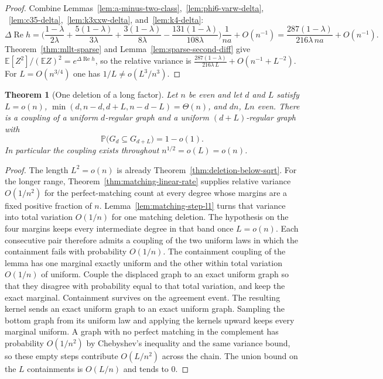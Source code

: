 \documentclass[11pt]{article}
\newtheorem{theorem}{Theorem}
\newcommand{\EE}{\mathbb{E}}
\newcommand{\PP}{\mathbb{P}}
\begin{document}
\begin{proof}
Combine Lemmas~\ref{lem:a-minus-two-class},~\ref{lem:phi6-varw-delta},
~\ref{lem:c35-delta},~\ref{lem:k3xxw-delta}, and~\ref{lem:k4-delta}:
\[
\Delta\operatorname{Re}h
=
\Biggl(
\frac{1-\lambda}{2\lambda}
+\frac{5(1-\lambda)}{3\lambda}
+\frac{3(1-\lambda)}{8\lambda}
-\frac{131(1-\lambda)}{108\lambda}
\Biggr)\frac1{na}+O(n^{-1})
=
\frac{287(1-\lambda)}{216\lambda\,na}+O(n^{-1}).
\]
Theorem~\ref{thm:mllt-sparse} and Lemma~\ref{lem:sparse-second-diff} give
\(\EE[Z^2]/(\EE Z)^2=e^{\Delta\operatorname{Re}h}\), so the relative variance is
\(\frac{287(1-\lambda)}{216\lambda\,L}+O(n^{-1}+L^{-2})\). For
\(L=O(n^{3/4})\) one has \(1/L\ne o(L^3/n^3)\).
\end{proof}

\begin{theorem}[One deletion of a long factor]
\label{thm:long-step}
\label{conj:long-step}
Let \(n\) be even and let \(d\) and \(L\) satisfy \(L=o(n)\),
\(\min(d,n-d,d+L,n-d-L)=\Theta(n)\), and \(dn\), \(Ln\) even.
There is a coupling of a uniform \(d\)-regular graph and a uniform
\((d+L)\)-regular graph with
\[
\PP\bigl(G_d\subseteq G_{d+L}\bigr)=1-o(1).
\]
In particular the coupling exists throughout
\(n^{1/2}=o(L)=o(n)\).
\end{theorem}

\begin{proof}
The length \(L^2=o(n)\) is already Theorem~\ref{thm:deletion-below-sqrt}.
For the longer range, Theorem~\ref{thm:matching-linear-rate} supplies relative
variance \(O(1/n^2)\) for the perfect-matching count at every degree whose
margins are a fixed positive fraction of \(n\).
Lemma~\ref{lem:matching-step-l1} turns that variance into total variation
\(O(1/n)\) for one matching deletion.
The hypothesis on the four margins keeps every intermediate degree in that
band once \(L=o(n)\).
Each consecutive pair therefore admits a coupling of the two uniform laws in
which the containment fails with probability \(O(1/n)\).
The containment coupling of the lemma has one marginal exactly uniform and the
other within total variation \(O(1/n)\) of uniform.
Couple the displaced graph to an exact uniform graph so that they disagree
with probability equal to that total variation, and keep the exact marginal.
Containment survives on the agreement event.
The resulting kernel sends an exact uniform graph to an exact uniform graph.
Sampling the bottom graph from its uniform law and applying the kernels upward
keeps every marginal uniform.
A graph with no perfect matching in the complement has probability
\(O(1/n^2)\) by Chebyshev's inequality and the same variance bound, so these
empty steps contribute \(O(L/n^2)\) across the chain.
The union bound on the \(L\) containments is \(O(L/n)\) and tends to \(0\).
\end{proof}
\end{document}
